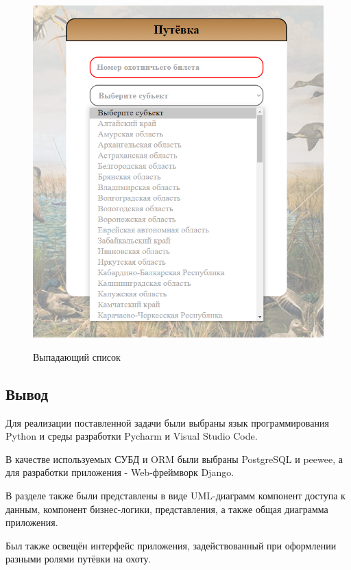 	\begin{figure}[h!]
		\centering
		\begin{center}
			{\includegraphics[scale=0.5]{schemes/screens/scroll_menu.png}}
			\caption{Выпадающий список}
			\label{fig34:image}
		\end{center}
	\end{figure}
	
	\subsection*{Вывод}
	Для реализации поставленной задачи были выбраны язык программирования Python и среды разработки Pycharm и Visual Studio Code.
	
	В качестве используемых СУБД и ORM были выбраны PostgreSQL и peewee, а для разработки приложения - Web-фреймворк Django.
	
	В разделе также были представлены в виде UML-диаграмм компонент доступа к данным, компонент бизнес-логики, представления, а также общая диаграмма приложения.
	
	Был также освещён интерфейс приложения, задействованный при оформлении разными ролями путёвки на охоту.
	
	
	
	
	










	
	
		
		 
		
	